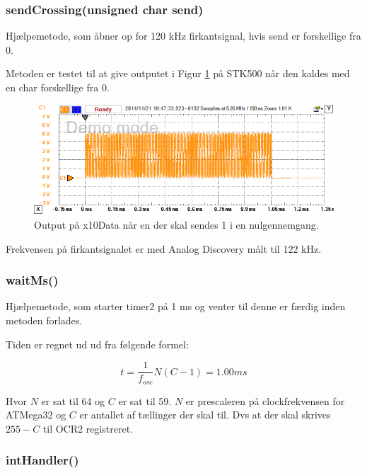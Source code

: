 \subsubsection{sendCrossing(unsigned char send)}

Hjælpemetode, som åbner op for 120 kHz firkantsignal, hvis send er forskellige fra 0.

Metoden er testet til at give outputet i Figur \ref{fig:sendCrossingtest} på STK500 når den kaldes med en char forskellige fra 0. 

\begin{figure}[h]
\centering
\includegraphics[width=\textwidth]{../Implementering/SW_implementering/Transmitter/sendCrossing_test}
\caption{Output på x10Data når en der skal sendes 1 i en nulgennemgang.}
\label{fig:sendCrossingtest}
\end{figure}

Frekvensen på firkantsignalet er med Analog Discovery målt til 122 kHz.

\subsubsection{waitMs()}

Hjælpemetode, som starter timer2 på 1 ms og venter til denne er færdig inden metoden forlades. 

Tiden er regnet ud ud fra følgende formel:

\begin{displaymath}
t = \frac{1}{f_{osc}} N (C - 1) = 1.00 ms
\end{displaymath}

Hvor $N$ er sat til 64 og $C$ er sat til 59. $N$ er prescaleren på clockfrekvensen for ATMega32 og $C$ er antallet af tællinger der skal til. Dvs at der skal skrives $255 - C$ til OCR2 registreret.

\subsubsection{intHandler()}

